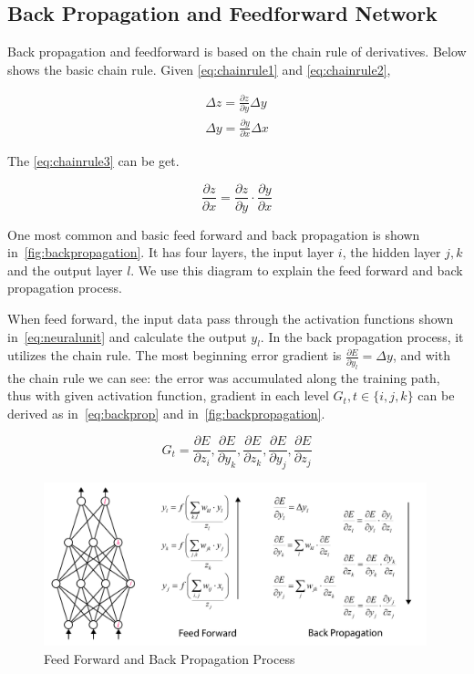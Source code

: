 \begin{spacing}{1.5}
\subsection{Back Propagation and Feedforward Network}
\label{subsec:back_propagation}

Back propagation and feedforward is based on the chain rule of derivatives. Below shows the basic chain rule. Given \autoref{eq:chainrule1} and \autoref{eq:chainrule2},

\begin{align}
    \Delta z=\frac{\partial z}{\partial y}\Delta y \label{eq:chainrule1}\\
    \Delta y=\frac{\partial y}{\partial x}\Delta x \label{eq:chainrule2}
\end{align}

The \autoref{eq:chainrule3} can be get.

\begin{equation}
\label{eq:chainrule3}
    \frac{\partial z}{\partial x}=\frac{\partial z}{\partial y} \cdot \frac{\partial y}{\partial x}
\end{equation}

One most common and basic feed forward and back propagation is shown in~\autoref{fig:backpropagation}. It has four layers, the input layer $i$, the hidden layer $j,k$ and the output layer $l$. We use this diagram to explain the feed forward and back propagation process.

When feed forward, the input data pass through the activation functions shown in~\autoref{eq:neuralunit} and calculate the output $y_l$. In the back propagation process, it utilizes the chain rule. The most beginning error gradient is $\frac{\partial E}{\partial y_l}=\Delta y$, and with the chain rule we can see: the error was accumulated along the training path, thus with given activation function, gradient in each level $G_t,t \in \{i,j,k\}$ can be derived as in~\autoref{eq:backprop} and in~\autoref{fig:backpropagation}.

\begin{equation}
\label{eq:backprop}
    G_t = \frac{\partial E}{\partial z_i},\frac{\partial E}{\partial y_k},\frac{\partial E}{\partial z_k},\frac{\partial E}{\partial y_j},\frac{\partial E}{\partial z_j}
\end{equation}

\begin{figure}[th]
\centering
\includegraphics[width=0.99\textwidth, fbox]{Chapter2/backpropagation.pdf}
\caption{Feed Forward and Back Propagation Process}
\label{fig:backpropagation} 
\end{figure}


\end{spacing}
